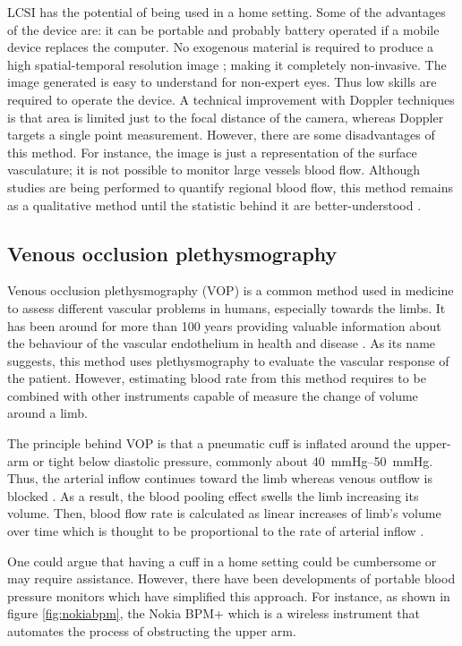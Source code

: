 LCSI has the potential of being used in a home setting. Some of the advantages of the device are: it can be portable and probably battery operated if a mobile device replaces the computer. No exogenous material is required to produce a high spatial-temporal resolution image \cite{duncan2008can}; making it completely non-invasive. The image generated is easy to understand for non-expert eyes. Thus low skills are required to operate the device. A technical improvement with Doppler techniques is that area is limited just to the focal distance of the camera, whereas Doppler targets a single point measurement. However, there are some disadvantages of this method. For instance, the image is just a representation of the surface vasculature; it is not possible to monitor large vessels blood flow. Although studies are being performed to quantify regional blood flow, this method remains as a qualitative method until the statistic behind it are better-understood \cite{duncan2008can}. 

\subsection{Venous occlusion plethysmography}
\label{section literature VOP}
Venous occlusion plethysmography (VOP) is a common method used in medicine to assess different vascular problems in humans, especially towards the limbs. It has been around for more than 100 years providing valuable information about the behaviour of the vascular endothelium in health and disease \cite{joyner2001belfast}. As its name suggests, this method uses plethysmography to evaluate the vascular response of the patient. However, estimating blood rate from this method requires to be combined with other instruments capable of measure the change of volume around a limb.

The principle behind VOP is that a pneumatic cuff is inflated around the upper-arm or tight below diastolic pressure, commonly about \SIrange{40}{50}{\mmHg}. Thus, the arterial inflow continues toward the limb whereas venous outflow is blocked \cite{casey2008measuring, joyner2001belfast}. As a result, the blood pooling effect swells the limb increasing its volume. Then, blood flow rate is calculated as linear increases of limb's volume over time which is thought to be proportional to the rate of arterial inflow \cite{casey2008measuring, joannides2006clinical}.

One could argue that having a cuff in a home setting could be cumbersome or may require assistance. However, there have been developments of portable blood pressure monitors which have simplified this approach. For instance, as shown in figure \ref{fig:nokiabpm}, the Nokia BPM+ \cite{nokiabpm} which is a wireless instrument that automates the process of obstructing the upper arm.

